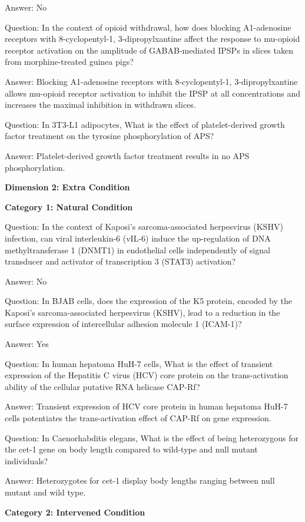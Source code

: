 Answer: No


Question: In the context of opioid withdrawal, how does blocking A1-adenosine receptors with 8-cyclopentyl-1, 3-dipropylxantine affect the response to mu-opioid receptor activation on the amplitude of GABAB-mediated IPSPs in slices taken from morphine-treated guinea pigs?

Answer: Blocking A1-adenosine receptors with 8-cyclopentyl-1, 3-dipropylxantine allows mu-opioid receptor activation to inhibit the IPSP at all concentrations and increases the maximal inhibition in withdrawn slices.

Question: In 3T3-L1 adipocytes, What is the effect of platelet-derived growth factor treatment on the tyrosine phosphorylation of APS?

Answer: Platelet-derived growth factor treatment results in no APS phosphorylation.

\textbf{Dimension 2: Extra Condition}

\textbf{Category 1: Natural Condition}

Question: In the context of Kaposi's sarcoma-associated herpesvirus (KSHV) infection, can viral interleukin-6 (vIL-6) induce the up-regulation of DNA methyltransferase 1 (DNMT1) in endothelial cells independently of signal transducer and activator of transcription 3 (STAT3) activation?

Answer: No

Question: In BJAB cells, does the expression of the K5 protein, encoded by the Kaposi's sarcoma-associated herpesvirus (KSHV), lead to a reduction in the surface expression of intercellular adhesion molecule 1 (ICAM-1)?

Answer: Yes

Question: In human hepatoma HuH-7 cells, What is the effect of transient expression of the Hepatitis C virus (HCV) core protein on the trans-activation ability of the cellular putative RNA helicase CAP-Rf?

Answer: Transient expression of HCV core protein in human hepatoma HuH-7 cells potentiates the trans-activation effect of CAP-Rf on gene expression.

Question: In Caenorhabditis elegans, What is the effect of being heterozygous for the cet-1 gene on body length compared to wild-type and null mutant individuals?

Answer: Heterozygotes for cet-1 display body lengths ranging between null mutant and wild type.

\textbf{Category 2: Intervened Condition} 

